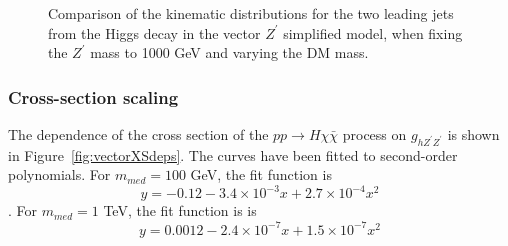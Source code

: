 \begin{figure}[hbpt!]
	\caption{Comparison of the kinematic distributions for the two leading jets from the Higgs decay in the vector $Z^\prime$ simplified model, 
		when fixing the $Z^\prime$ mass to 1000 GeV and varying the DM mass. 
		\label{fig:VectorHbb_1000}}
\end{figure}

\subsubsection{Cross-section scaling}

The dependence of the cross section of the $pp \rightarrow H\chi\bar{\chi}$ process 
on $g_{h Z^\prime Z^\prime}$ is shown in Figure~\ref{fig:vectorXSdeps}. 
The curves have been fitted to second-order polynomials. 
For $m_{med} = 100$ GeV, the fit function is 
$$y = -0.12 - 3.4\times10^{-3}x + 2.7\times10^{-4}x^2$$.
For $m_{med} = 1$ TeV, the fit function is 
is $$y = 0.0012 - 2.4\times10^{-7}x + 1.5\times10^{-7}x^2$$

